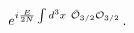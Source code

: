 \begin{equation}\label{eq:fermdbl}
e^{i\frac{E}{2N}\int d^3x\  \bar{\cal O}_{3/2}{\cal O}_{3/2}}\,.
\end{equation}

